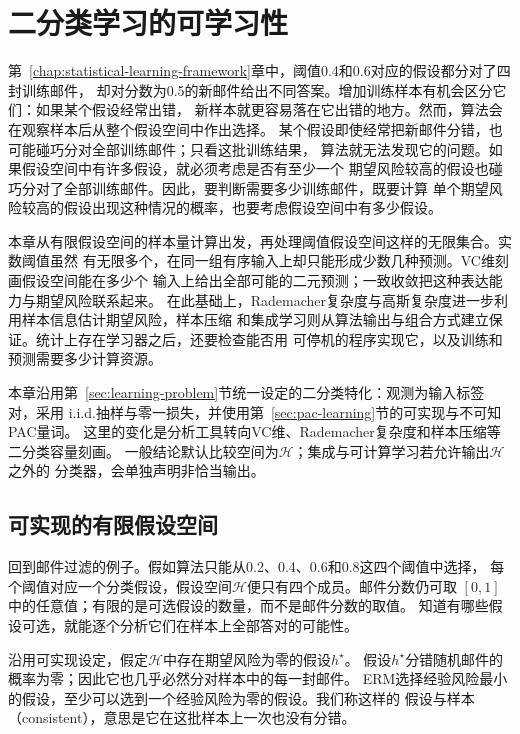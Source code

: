 \chapter{二分类学习的可学习性}
\label{chap:binary-learnability}

第~\ref{chap:statistical-learning-framework}章中，阈值0.4和0.6对应的假设都分对了四封训练邮件，
却对分数为0.5的新邮件给出不同答案。增加训练样本有机会区分它们：如果某个假设经常出错，
新样本就更容易落在它出错的地方。然而，算法会在观察样本后从整个假设空间中作出选择。
某个假设即使经常把新邮件分错，也可能碰巧分对全部训练邮件；只看这批训练结果，
算法就无法发现它的问题。如果假设空间中有许多假设，就必须考虑是否有至少一个
期望风险较高的假设也碰巧分对了全部训练邮件。因此，要判断需要多少训练邮件，既要计算
单个期望风险较高的假设出现这种情况的概率，也要考虑假设空间中有多少假设。

本章从有限假设空间的样本量计算出发，再处理阈值假设空间这样的无限集合。实数阈值虽然
有无限多个，在同一组有序输入上却只能形成少数几种预测。VC维刻画假设空间能在多少个
输入上给出全部可能的二元预测；一致收敛把这种表达能力与期望风险联系起来。
在此基础上，Rademacher复杂度与高斯复杂度进一步利用样本信息估计期望风险，样本压缩
和集成学习则从算法输出与组合方式建立保证。统计上存在学习器之后，还要检查能否用
可停机的程序实现它，以及训练和预测需要多少计算资源。

本章沿用第~\ref{sec:learning-problem}节统一设定的二分类特化：观测为输入标签对，采用
i.i.d.抽样与零一损失，并使用第~\ref{sec:pac-learning}节的可实现与不可知PAC量词。
这里的变化是分析工具转向VC维、Rademacher复杂度和样本压缩等二分类容量刻画。
一般结论默认比较空间为$\mathcal H$；集成与可计算学习若允许输出$\mathcal H$之外的
分类器，会单独声明非恰当输出。

\section{可实现的有限假设空间}
\label{sec:binary-finite-class}

回到邮件过滤的例子。假如算法只能从0.2、0.4、0.6和0.8这四个阈值中选择，
每个阈值对应一个分类假设，假设空间$\mathcal H$便只有四个成员。邮件分数仍可取
$[0,1]$中的任意值；有限的是可选假设的数量，而不是邮件分数的取值。
知道有哪些假设可选，就能逐个分析它们在样本上全部答对的可能性。

沿用可实现设定，假定$\mathcal H$中存在期望风险为零的假设$h^\star$。
假设$h^\star$分错随机邮件的概率为零；因此它也几乎必然分对样本中的每一封邮件。
ERM选择经验风险最小的假设，至少可以选到一个经验风险为零的假设。我们称这样的
假设与样本（consistent），意思是它在这批样本上一次也没有分错。


